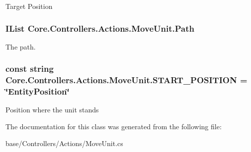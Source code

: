 Target Position 

\hypertarget{classCore_1_1Controllers_1_1Actions_1_1MoveUnit_a32d0ea3d4b02301de1b754a4e8bcaacd}{}
\subsubsection[{Path}]{\setlength{\rightskip}{0pt plus 5cm}I\+List Core.\+Controllers.\+Actions.\+Move\+Unit.\+Path}\label{classCore_1_1Controllers_1_1Actions_1_1MoveUnit_a32d0ea3d4b02301de1b754a4e8bcaacd}


The path. 

\hypertarget{classCore_1_1Controllers_1_1Actions_1_1MoveUnit_aa00af18610776c1a0eebde8ae273286a}{}
\subsubsection[{S\+T\+A\+R\+T\+\_\+\+P\+O\+S\+I\+T\+I\+O\+N}]{\setlength{\rightskip}{0pt plus 5cm}const string Core.\+Controllers.\+Actions.\+Move\+Unit.\+S\+T\+A\+R\+T\+\_\+\+P\+O\+S\+I\+T\+I\+O\+N = \char`\"{}Entity\+Position\char`\"{}}\label{classCore_1_1Controllers_1_1Actions_1_1MoveUnit_aa00af18610776c1a0eebde8ae273286a}


Position where the unit stands 



The documentation for this class was generated from the following file\+:\begin{DoxyCompactItemize}
\item 
base/\+Controllers/\+Actions/Move\+Unit.\+cs\end{DoxyCompactItemize}
